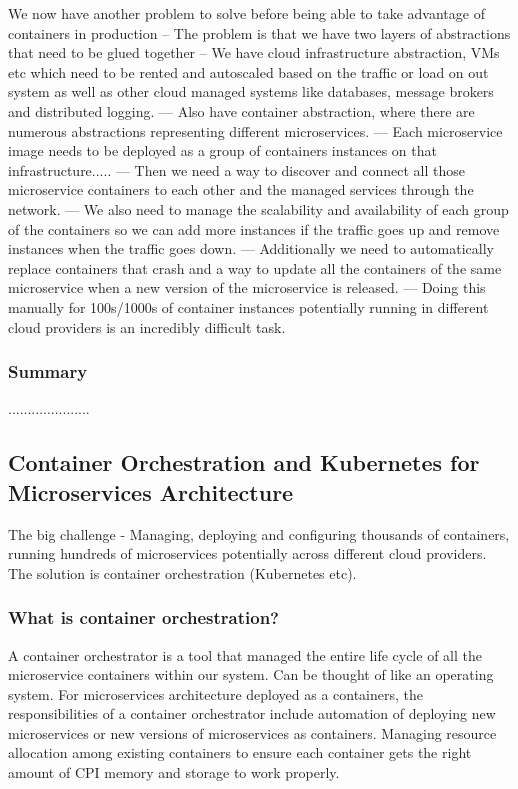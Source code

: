 \documentclass[a4paper, 11pt]{book}
\begin{document}
    We now have another problem to solve before being able to take advantage of containers in production
    -- The problem is that we have two layers of abstractions that need to be glued together
    -- We have cloud infrastructure abstraction, VMs etc which need to be rented and autoscaled based on the traffic or load on out system as well as other cloud managed systems like databases, message brokers and distributed logging.
    --- Also have container abstraction, where there are numerous abstractions representing different microservices.
    --- Each microservice image needs to be deployed as a group of containers instances on that infrastructure.....
    --- Then we need a way to discover and connect all those microservice containers to each other and the managed services through the network.
    --- We also need to manage the scalability and availability of each group of the containers so we can add more instances if the traffic goes up and remove instances when the traffic goes down.
    --- Additionally we need to automatically replace containers that crash and a way to update all the containers of the same microservice when a new version of the microservice is released.
    --- Doing this manually for 100s/1000s of container instances potentially running in different cloud providers is an incredibly difficult task.

    \subsubsection{Summary}
    .....................

    \subsection{Container Orchestration and Kubernetes for Microservices Architecture}
    The big challenge - Managing, deploying and configuring thousands of containers, running hundreds of microservices potentially across different cloud providers.
    The solution is container orchestration (Kubernetes etc).

    \subsubsection{What is container orchestration?}
    A container orchestrator is a tool that managed the entire life cycle of all the microservice containers within our system.
    Can be thought of like an operating system.
    For microservices architecture deployed as a containers, the responsibilities of a container orchestrator include automation of deploying new microservices or new versions of microservices as containers.
    Managing resource allocation among existing containers to ensure each container gets the right amount of CPI memory and storage to work properly.
\end{document}
